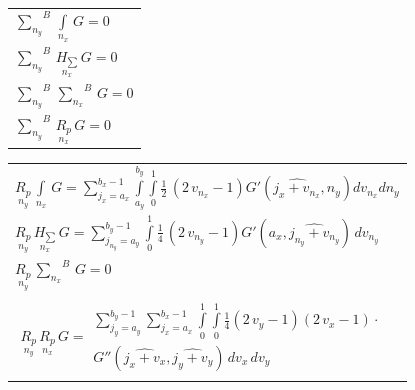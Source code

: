 \documentclass[twoside, 10pt]{article}
\begin{document}
\begin{multicols}{2}
\begin{center}
\begin{tabular}{ | l | }
\end{tabular}
\end{center}

    \begin{center}
\begin{tabular}{ | l | }

\hline

${\sum\limits_{n_y}^{}}^{B}\,\int\limits_{n_x}^{}\,G = 0$ \\

${\sum\limits_{n_y}^{}}^{B}\,\underset{n_x}{H_{\sum}}\,G = 0$ \\

${\sum\limits_{n_y}^{}}^{B}\,{\sum\limits_{n_x}^{}}^{B}\,G = 0$ \\

${\sum\limits_{n_y}^{}}^{B}\,\underset{n_x}{R_{p}}\,G = 0$ \\

\hline

\end{tabular}
\end{center}

    \begin{center}
\begin{tabular}{ | l | }

\hline

$\underset{n_y}{R_{p}}\,\int\limits_{n_x}^{}\,G = {\sum\limits_{j_{x}=a_{x}}^{b_{x} - 1} \int\limits_{a_{y}}^{b_{y}} \int\limits_{0}^{1} \frac{1}{2} \, {\left(2 \, v_{n_{x}} - 1\right)} G'\left(\widehat{j_{x} + v_{n_{x}}}, n_{y}\right){d v_{n_{x}}}{d n_{y}}}$ \\

$\underset{n_y}{R_{p}}\,\underset{n_x}{H_{\sum}}\,G = {\sum\limits_{j_{n_{y}}=a_{y}}^{b_{y} - 1} \int\limits_{0}^{1} \frac{1}{4} \, {\left(2 \, v_{n_{y}} - 1\right)} G'\left(a_{x}, \widehat{j_{n_{y}} + v_{n_{y}}}\right)\,{d v_{n_{y}}}}$ \\

$\underset{n_y}{R_{p}}\,{\sum\limits_{n_x}^{}}^{B}\,G = 0$ \\



$\begin{array}{lr}
\underset{n_y}{R_{p}}\,\underset{n_x}{R_{p}}\,G =
\begin{array}{c}
 \sum\limits_{j_{y}=a_{y}}^{b_{y} - 1} \sum\limits_{j_{x}=a_{x}}^{b_{x} - 1} \int\limits_{0}^{1} \int\limits_{0}^{1}\frac{1}{4} \left(2 \, v_{y} - 1\right)  \left(2 \, v_{x} - 1\right) \cdot \\
G''\left(\widehat{j_{x} + v_{x}}, \widehat{j_{y} + v_{y}}\right)\,{d v_{x}}\,{d v_{y}}
\end{array}
\end{array}$ \\



\end{tabular}
\end{center}
\end{multicols}
\end{document}
